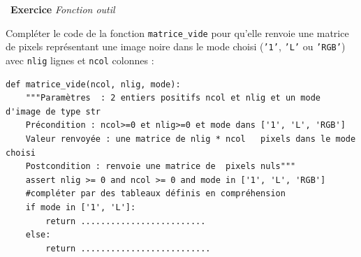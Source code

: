 \documentclass[a4paper, french, 12pt]{article}
\newcounter{exo}
\newenvironment{exercice}[1]
{\par \medskip   \addtocounter{exo}{1} \noindent  
\begin{bclogo}[arrondi =0.1,   noborder = true, logo=\bccrayon, marge=4]{~\textbf{Exercice} \textbf{\theexo} {\itshape #1} }  \par}
{
\end{bclogo}
 \par \bigskip }
\newcounter{def}
\begin{document}
\vspace*{-15pt}


\begin{exercice}{Fonction outil}

Compléter le code de la fonction \texttt{matrice\_vide} pour qu'elle renvoie une matrice de pixels représentant une image noire dans le mode choisi (\texttt{'1'}, \texttt{'L'} ou \texttt{'RGB'}) avec \texttt{nlig} lignes et \texttt{ncol} colonnes :

\begin{lstlisting}[style=rond]
def matrice_vide(ncol, nlig, mode):
    """Paramètres  : 2 entiers positifs ncol et nlig et un mode d'image de type str
    Précondition : ncol>=0 et nlig>=0 et mode dans ['1', 'L', 'RGB']
    Valeur renvoyée : une matrice de nlig * ncol   pixels dans le mode choisi
    Postcondition : renvoie une matrice de  pixels nuls"""
    assert nlig >= 0 and ncol >= 0 and mode in ['1', 'L', 'RGB']
    #compléter par des tableaux définis en compréhension
    if mode in ['1', 'L']:
        return .........................
    else:               
        return ..........................
\end{lstlisting}




\end{exercice}


\vspace*{-15pt}
\end{document}
